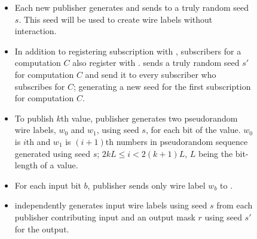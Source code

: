 \begin{figure}[h]
\begin{mdframed}[style=myframe]

\initialize
\begin{itemize}[leftmargin=*,itemsep=4pt,topsep=4pt]
 
	\item Each new publisher generates and sends to \garbler a truly random seed
		$s$. This seed will be used to create wire labels without interaction.

\end{itemize}

\subscribe
\begin{itemize}[leftmargin=*,itemsep=4pt,topsep=4pt]

	\item In addition to registering subscription with \broker, subscribers for a
		computation $C$ also register with \garbler. \garbler sends a truly
		random seed $s'$ for computation $C$ and send it to every subscriber who
		subscribes for $C$; generating a new seed for the first subscription for
		computation $C$.
		
\end{itemize}

\publish
\begin{itemize}[leftmargin=*,itemsep=4pt,topsep=4pt]
		
	\item To publish $k$th value, publisher generates two pseudorandom wire
		labels, $w_0$ and $w_1$, using seed $s$, for each bit of the value.  $w_0$
		is $i$th and $w_1$ is $(i+1)$th numbers in pseudorandom sequence generated
		using seed $s$; $2kL \leq i < 2(k+1)L$, $L$ being the bit-length of a
		value.

	\item For each input bit $b$, publisher sends only wire label $w_b$ to
		\broker.

\end{itemize}

\process
\begin{itemize}[leftmargin=*,itemsep=4pt,topsep=4pt]

	\item \garbler independently generates input wire labels using seed $s$ from
		each publisher contributing input and an output mask $r$ using seed $s'$
		for the output.

\end{itemize}

\vspace{8pt}


\end{mdframed}
\end{figure}
